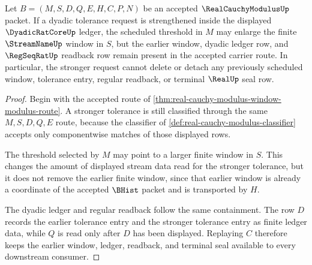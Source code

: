 \begin{theorem}
\label{thm:real-cauchy-modulus-window-monotonicity}
Let $B=(M,S,D,Q,E,H,C,P,N)$ be an accepted $\RealCauchyModulusUp$ packet. If a dyadic tolerance request is strengthened inside the displayed $\DyadicRatCoreUp$ ledger, the scheduled threshold in $M$ may enlarge the finite $\StreamNameUp$ window in $S$, but the earlier window, dyadic ledger row, and $\RegSeqRatUp$ readback row remain present in the accepted carrier route. In particular, the stronger request cannot delete or detach any previously scheduled window, tolerance entry, regular readback, or terminal $\RealUp$ seal row.
\end{theorem}
\begin{proof}
Begin with the accepted route of \autoref{thm:real-cauchy-modulus-window-modulus-route}. A stronger tolerance is still classified through the same $M,S,D,Q,E$ route, because the classifier of \autoref{def:real-cauchy-modulus-classifier} accepts only componentwise matches of those displayed rows.

The threshold selected by $M$ may point to a larger finite window in $S$. This changes the amount of displayed stream data read for the stronger tolerance, but it does not remove the earlier finite window, since that earlier window is already a coordinate of the accepted $\BHist$ packet and is transported by $H$.

The dyadic ledger and regular readback follow the same containment. The row $D$ records the earlier tolerance entry and the stronger tolerance entry as finite ledger data, while $Q$ is read only after $D$ has been displayed. Replaying $C$ therefore keeps the earlier window, ledger, readback, and terminal seal available to every downstream consumer.
\end{proof}

